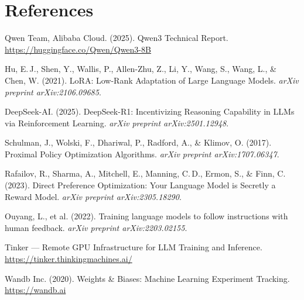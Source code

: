 \documentclass[12pt, a4paper]{article}
\begin{document}
\newpage

\section*{References}

\begin{enumerate}[leftmargin=1.5em, itemsep=6pt, label={[\arabic*]}]

  \item Qwen Team, Alibaba Cloud. (2025). Qwen3 Technical Report.
    \url{https://huggingface.co/Qwen/Qwen3-8B}

  \item Hu, E.\,J., Shen, Y., Wallis, P., Allen-Zhu, Z., Li, Y., Wang, S.,
    Wang, L., \& Chen, W. (2021). LoRA: Low-Rank Adaptation of Large Language
    Models. \textit{arXiv preprint arXiv:2106.09685}.

  \item DeepSeek-AI. (2025). DeepSeek-R1: Incentivizing Reasoning Capability in
    LLMs via Reinforcement Learning. \textit{arXiv preprint arXiv:2501.12948}.

  \item Schulman, J., Wolski, F., Dhariwal, P., Radford, A., \& Klimov, O. (2017).
    Proximal Policy Optimization Algorithms. \textit{arXiv preprint
    arXiv:1707.06347}.

  \item Rafailov, R., Sharma, A., Mitchell, E., Manning, C.\,D., Ermon, S., \&
    Finn, C. (2023). Direct Preference Optimization: Your Language Model is
    Secretly a Reward Model. \textit{arXiv preprint arXiv:2305.18290}.

  \item Ouyang, L., et al. (2022). Training language models to follow instructions
    with human feedback. \textit{arXiv preprint arXiv:2203.02155}.

  \item Tinker --- Remote GPU Infrastructure for LLM Training and Inference.
    \url{https://tinker.thinkingmachines.ai/}

  \item Wandb Inc. (2020). Weights \& Biases: Machine Learning Experiment
    Tracking. \url{https://wandb.ai}

\end{enumerate}
\end{document}
